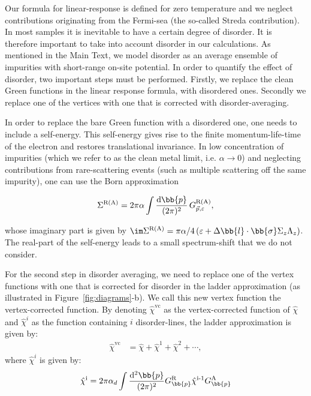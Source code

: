 Our formula for linear-response is defined for zero temperature and we neglect contributions originating from the Fermi-sea (the so-called Streda contribution).  In most samples it is inevitable to have a certain degree of disorder. It is therefore important to take into account disorder in our calculations. As mentioned in the Main Text, we model disorder as an average ensemble of impurities with short-range on-site potential. In order to quantify the effect of disorder, two important steps must be performed. Firstly, we replace the clean Green functions in the linear response formula, with disordered ones. Secondly we replace one of the vertices with one that is corrected with disorder-averaging.

In order to replace the bare Green function with a disordered one, one needs to include a self-energy. This self-energy gives rise to the finite momentum-life-time of the electron and restores translational invariance.  In low concentration of impurities (which we refer to as the clean metal limit, i.e. $\alpha\rightarrow0$) and neglecting contributions from rare-scattering events (such as multiple scattering off the same impurity), one can use the Born approximation

\begin{equation}
\Sigma^\text{R(A)} = 2\pi\alpha \int \frac{\mathrm{d}\bb{p}}{(2\pi)^2}\,G^\text{R(A)}_{\vec{p},\varepsilon},
\end{equation}

whose imaginary part is given by $\im \Sigma^\text{R(A)} = \pi\alpha/4\,(\varepsilon + \Delta \bb{l}\cdot\bb{\sigma}\Sigma_z\Lambda_z)$. The real-part of the self-energy leads to a small spectrum-shift that we do not consider. 

For the second step in disorder averaging, we need to replace one of the vertex functions with one that is corrected for disorder in the ladder approximation (as illustrated in Figure~\ref{fig:diagrams}-b). We call this new vertex function the vertex-corrected function. 
By denoting $\hat{\chi}^{\text{vc}}$ as the vertex-corrected function of $\hat{\chi}$ and $\hat{\chi}^i$ as the function containing $i$ disorder-lines, the ladder approximation is given by:
\begin{align}
    \hat{\chi}^\text{vc}
      &=           
        \hat{\chi}+\hat{\chi}^1+\hat{\chi}^2+\cdots,
        \label{intro:eq:ladder}
\end{align}
where $\hat{\chi}^i$ is given by:
\begin{align}
    \hat{\chi}^\text{i} = 2\pi\alpha_d\int\frac{\mathrm{d}^2\bb{p}}{(2\pi)^2} G_{\bb{p}}^\text{R}\hat{\chi}^\text{i-1}G_{\bb{p}}^\text{A}
    \label{intro:eq:onedisorderline}
\end{align}


